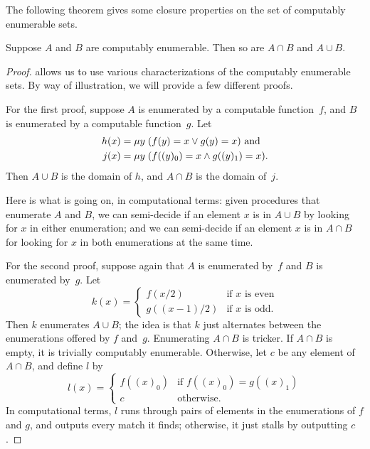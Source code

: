 \documentclass[../../../include/open-logic-section]{subfiles}
\begin{document}


The following theorem gives some closure properties on the set of
computably enumerable sets.

\begin{thm}
Suppose $A$ and $B$ are computably enumerable. Then so are $A \cap B$
and $A \cup B$.
\end{thm}

\begin{proof}
 allows us to use various characterizations
of the computably enumerable sets. By way of illustration, we will
provide a few different proofs.

For the first proof, suppose $A$ is enumerated by a computable
function~$f$, and $B$ is enumerated by a computable function~$g$. Let
\begin{align*}
h(x) & = \mu y \; (f(y) = x \lor g(y) = x) \text{ and}\\
j(x) & = \mu y \; (f((y)_0) = x \land g((y)_1) = x).
\end{align*}
Then $A \cup B$ is the domain of $h$, and $A \cap B$ is the domain
of~$j$.

\begin{explain}
Here is what is going on, in computational terms: given
procedures that enumerate $A$ and $B$, we can semi-decide if an
element $x$ is in $A \cup B$ by looking for $x$ in either enumeration;
and we can semi-decide if an element $x$ is in $A \cap B$ for looking
for $x$ in both enumerations at the same time.
\end{explain}

For the second proof, suppose again that $A$ is enumerated by~$f$ and
$B$ is enumerated by~$g$. Let
\[
k(x) = \begin{cases}
f(x/2) & \text{if $x$ is even} \\
g((x-1)/2) & \text{if $x$ is odd.}
\end{cases}
\]
Then $k$ enumerates $A \cup B$; the idea is that $k$ just alternates
between the enumerations offered by $f$ and~$g$. Enumerating $A \cap
B$ is tricker. If $A \cap B$ is empty, it is trivially computably
enumerable. Otherwise, let $c$ be any element of $A \cap B$, and
define $l$ by
\[
l(x) = \begin{cases}
f((x)_0) & \text{if $f((x)_0) = g((x)_1)$} \\
c & \text{otherwise.}
\end{cases}
\]
In computational terms, $l$ runs through pairs of elements in the
enumerations of $f$ and $g$, and outputs every match it finds;
otherwise, it just stalls by outputting $c$.


\end{proof}
\end{document}

